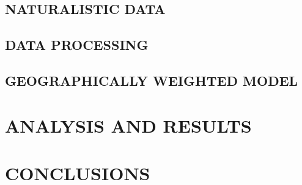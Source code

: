 \section{NATURALISTIC DATA} \label{ndsc}



\section{DATA PROCESSING} \label{data}






\section{GEOGRAPHICALLY WEIGHTED MODEL} \label{gwm}




\chapter{ANALYSIS AND RESULTS}









\chapter{CONCLUSIONS}
